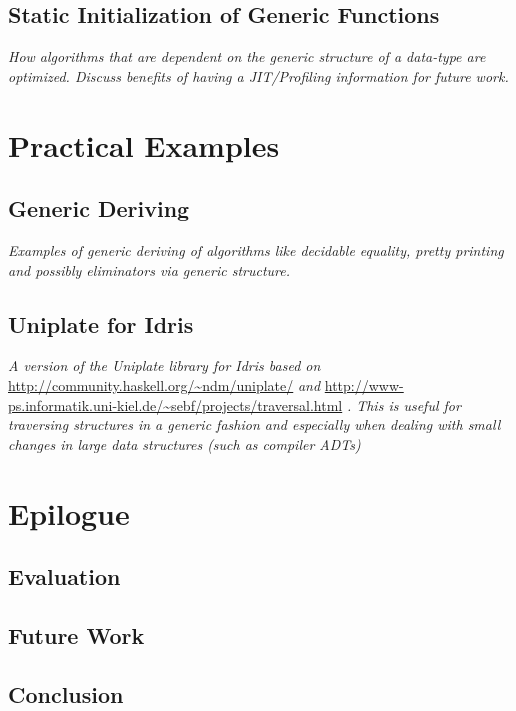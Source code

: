 \documentclass{ituthesis}
\begin{document}
\section{Static Initialization of Generic Functions}
\label{sec:StaticInitializationofGenericFunctions}
\textit{How algorithms that are dependent on the generic structure of a data-type are optimized. Discuss benefits of having a JIT/Profiling information for future work.}
\chapter{Practical Examples}
\label{cha:PracticalExamples}
\section{Generic Deriving}
\label{sec:GenericDeriving}
\textit{Examples of generic deriving of algorithms like decidable equality, pretty printing and possibly eliminators via generic structure.}
\section{Uniplate for Idris}
\label{sec:UniplateforIdris}
\textit{A version of the Uniplate library for Idris based on} \url{http://community.haskell.org/~ndm/uniplate/} \textit{and} \url{http://www-ps.informatik.uni-kiel.de/~sebf/projects/traversal.html} \textit{.
This is useful for traversing structures in a generic fashion and especially when dealing with small changes in large data structures (such as compiler ADTs)}
\chapter{Epilogue}
\label{cha:Epilogue}
\section{Evaluation}
\label{sec:Evaluation}
\section{Future Work}
\label{sec:FutureWork}
\section{Conclusion}
\label{sec:Conclusion}
\end{document}
